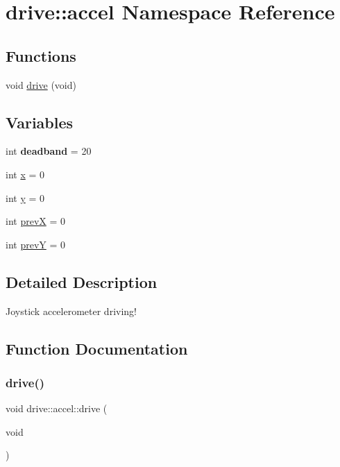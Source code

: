 \hypertarget{namespacedrive_1_1accel}{}\section{drive\+:\+:accel Namespace Reference}
\label{namespacedrive_1_1accel}
\subsection*{Functions}
\begin{DoxyCompactItemize}
\item 
void \hyperlink{namespacedrive_1_1accel_a6d0c42c5e3f1ff1db68617de9d4b1758}{drive} (void)
\end{DoxyCompactItemize}
\subsection*{Variables}
\begin{DoxyCompactItemize}
\item 
\mbox{\label{namespacedrive_1_1accel_a14bc27053dde38ad7e09e8bb78c44d1a}} 
int {\bfseries deadband} = 20
\item 
int \hyperlink{namespacedrive_1_1accel_ac04cdc79ef60e183664808e63c64204a}{x} = 0
\item 
int \hyperlink{namespacedrive_1_1accel_ab30da3026058091c6ee42e12c4e62432}{y} = 0
\item 
int \hyperlink{namespacedrive_1_1accel_aff072ce199309a54b7bc8e3f80f6e15c}{prevX} = 0
\item 
int \hyperlink{namespacedrive_1_1accel_ae0f4ef2b1c049d481f496d680dd3f9bd}{prevY} = 0
\end{DoxyCompactItemize}


\subsection{Detailed Description}
Joystick accelerometer driving! 

\subsection{Function Documentation}
\mbox{\label{namespacedrive_1_1accel_a6d0c42c5e3f1ff1db68617de9d4b1758}} 
\subsubsection{\texorpdfstring{drive()}{drive()}}
{\footnotesize\ttfamily void drive\+::accel\+::drive (\begin{DoxyParamCaption}\item[{void}]{ }\end{DoxyParamCaption})}

